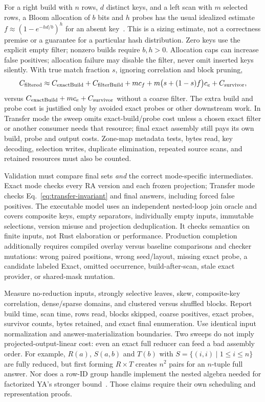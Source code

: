 For a right build with $n$ rows, $d$ distinct keys, and a left scan with $m$
selected rows, a Bloom allocation of $b$ bits and $h$ probes has the usual
idealized estimate $f\approx(1-e^{-hd/b})^h$ for an absent key~\cite{ya-bloom}.
This is a sizing estimate, not a correctness premise or a guarantee for a
particular hash distribution. Zero keys use the explicit empty filter;
nonzero builds require $b,h>0$. Allocation caps can increase false positives;
allocation failure may disable the filter, never omit inserted keys silently.
With true match fraction $s$, ignoring correlation and block pruning,
\[
 C_{\rm filtered}\approx C_{\rm exactBuild}+C_{\rm filterBuild}
       +m c_f+m\bigl(s+(1-s)f\bigr)c_e+C_{\rm survivor},
\]
versus $C_{\rm exactBuild}+mc_e+C_{\rm survivor}$ without a coarse filter.
The extra build and probe cost is justified only by avoided exact probes or
other downstream work. In Transfer mode the sweep omits exact-build/probe
cost unless a chosen exact filter or another consumer needs that resource;
final exact assembly still pays its own build, probe and output costs.
Zone-map metadata tests, bytes read, key decoding, selection writes, duplicate
elimination, repeated source scans, and retained resources must also be counted.

Validation must compare final sets \emph{and} the correct mode-specific
intermediates. Exact mode checks every RA version and each frozen projection;
Transfer mode checks Eq.~\eqref{eq:transfer-invariant} and final answers,
including forced false positives. The executable model uses an independent
nested-loop join oracle and covers composite keys, empty separators,
individually empty inputs, immutable selections, version misuse and projection
deduplication. It checks semantics on finite inputs, not Rust elaboration or
performance. Production completion additionally requires compiled overlay
versus baseline comparisons and checker mutations: wrong paired positions,
wrong seed/layout, missing exact probe, a candidate labeled Exact, omitted
occurrence, build-after-scan, stale exact provider, or shared-mask mutation.

Measure no-reduction inputs, strongly selective leaves, skew, composite-key
correlation, dense/sparse domains, and clustered versus shuffled blocks.
Report build time, scan time, rows read, blocks skipped, coarse positives,
exact probes, survivor counts, bytes retained, and exact final enumeration.
Use identical input normalization and answer-materialization boundaries.
Two sweeps do not imply projected-output-linear cost: even an exact full
reducer can feed a bad assembly order. For example, $R(a)$, $S(a,b)$ and
$T(b)$ with $S=\{(i,i)\mid1\le i\le n\}$ are fully reduced, but first
forming $R\times T$ creates $n^2$ pairs for an $n$-tuple full answer.
Nor does a row-ID group handle implement the nested algebra needed for
factorized YA's stronger bound~\cite{ya-shredded}. Those claims require their
own scheduling and representation proofs.
